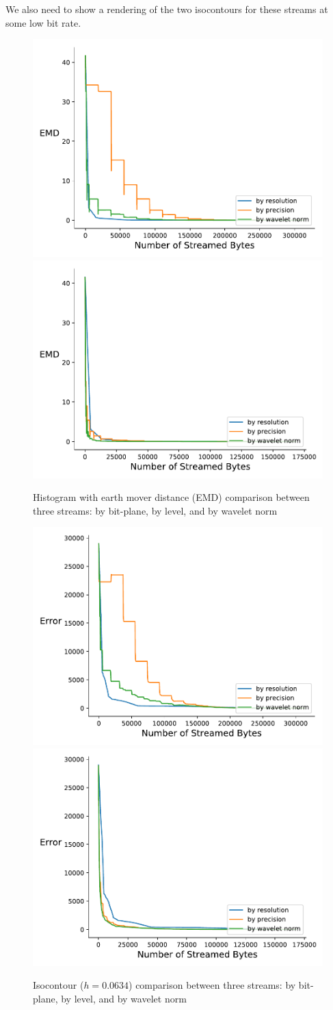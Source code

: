 We also need to show a rendering of the two isocontours for these streams at some low bit rate.

\begin{figure}[htb!]
	\centering
	{\includegraphics[width=0.4\linewidth]{img/independent/histogram-miranda-viscosity}}
	{\includegraphics[width=0.4\linewidth]{img/skip-zeros/histogram-miranda-viscosity}}
	\caption {Histogram with earth mover distance (EMD) comparison between three streams: by bit-plane, by level, and by wavelet norm}
	\label{fig:histogram_traditional_vs_by_norm_viscosity}
\end{figure}


\begin{figure}[htb!]
	\centering
	{\includegraphics[width=0.4\linewidth]{img/independent/isocontour-miranda-viscosity}}
	{\includegraphics[width=0.4\linewidth]{img/skip-zeros/isocontour-miranda-viscosity}}
	\caption {Isocontour ($h = 0.0634$) comparison between three streams: by bit-plane, by level, and by wavelet norm}
	\label{fig:isocontour_traditional_vs_by_norm_viscosity}
\end{figure}




